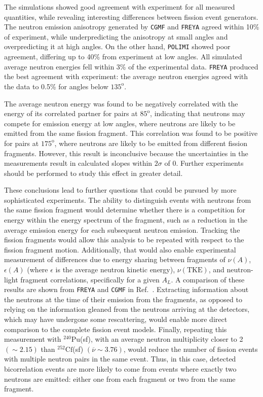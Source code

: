 \documentclass[preprint,12pt]{elsarticle}
\newcommand{\refref}[1]  {Ref.~\cite{#1}}
\newcommand{\cgmf}            {\texttt{CGMF}\xspace}
\newcommand{\freya}           {\texttt{FREYA}\xspace}
\newcommand{\polimi}          {\texttt{POLIMI}\xspace}
\newcommand{\degrees}[1]{\ensuremath{#1^{\mathrm{o}}}\xspace}
\newcommand{\Cftft}{\ensuremath{^{252}\text{Cf}}\xspace}
\newcommand{\Putf}{\ensuremath{^{240}\text{Pu}}\xspace}
\begin{document}
The simulations showed good agreement with experiment for all measured quantities, while revealing interesting differences between fission event generators. The neutron emission anisotropy generated by \cgmf and \freya agreed within 10\% of experiment, while underpredicting the anisotropy at small angles and overpredicting it at high angles. On the other hand, \polimi showed poor agreement, differing up to 40\% from experiment at low angles. All simulated average neutron energies fell within 3\% of the experimental data. \freya produced the best agreement with experiment: the average neutron energies agreed with the data to 0.5\% for angles below \degrees{135}.

The average neutron energy was found to be negatively correlated with the energy of its correlated partner for pairs at \degrees{85}, indicating that neutrons may compete for emission energy at low angles, where neutrons are likely to be emitted from the same fission fragment. This correlation was found to be positive for pairs at \degrees{175}, where neutrons are likely to be emitted from different fission fragments. However, this result is inconclusive because the uncertainties in the measurements result in  calculated slopes within $2\sigma$ of 0. Further experiments should be performed to study this effect in greater detail. 

These conclusions lead to further questions that could be pursued by more sophisticated experiments. The ability to distinguish events with neutrons from the same fission fragment would determine whether there is a competition for energy within the energy spectrum of the fragment, such as a reduction in the average emission energy for each subsequent neutron emission. Tracking the fission fragments would allow this analysis to be repeated with respect to the fission fragment motion. Additionally, that would also enable experimental measurement of differences due to energy sharing between fragments of $\nu(A)$, $\epsilon(A)$ (where $\epsilon$ is the average neutron kinetic energy), $\nu(\text{TKE})$, and neutron-light fragment correlations, specifically for a given $A_L$. A comparison of these results are shown from \freya and \cgmf in \refref{Talou2018}. Extracting information about the neutrons at the time of their emission from the fragments, as opposed to relying on the information gleaned from the neutrons arriving at the detectors, which may have undergone some rescattering, would enable more direct comparison to the complete fission event models. Finally, repeating this measurement with \Putf(sf), with an average neutron multiplicity closer to 2 $(\sim2.15)$ than \Cftft(sf) $(\overline \nu \sim3.76)$, would reduce the number of fission events with multiple neutron pairs in the same event. Thus, in this case, detected bicorrelation events are more likely to come from events where exactly two neutrons are emitted: either one from each fragment or two from the same fragment.
\end{document}
